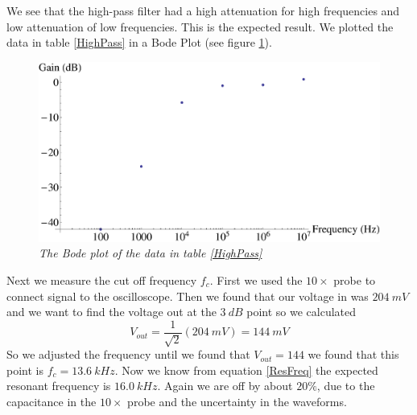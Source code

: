 \documentclass[11pt]{article}
\numberwithin{equation}{section}
\numberwithin{figure}{section}
\numberwithin{table}{section}
\begin{document}
We see that the high-pass filter had a high attenuation for high frequencies and low attenuation of low frequencies. This is the expected result. We plotted the data in table \ref{HighPass} in a Bode Plot (see figure \ref{BodePlotHighPass}).
\begin{figure}[h]
\centering
\includegraphics[scale=0.60]{BodePlotHighPass.eps}
\caption{\textit{The Bode plot of the data in table \ref{HighPass}}}
\label{BodePlotHighPass}
\end{figure}

Next we measure the cut off frequency $f_c$. First we used the $10\times$ probe to connect signal to the oscilloscope. Then we found that our voltage in was $204\ mV$ and we want to find the voltage out at the $3\ dB$ point so we calculated
$$V_{out} = \frac{1}{\sqrt{2}}(204\ mV) = 144\ mV$$
So we adjusted the frequency until we found that $V_{out} = 144$ we found that this point is $f_c = 13.6\ kHz$. Now we know from equation \ref{ResFreq} the expected resonant frequency is $16.0\ kHz$. Again we are off by about $20\%$, due to the capacitance in the $10\times$ probe and the uncertainty in the waveforms.
\end{document}
